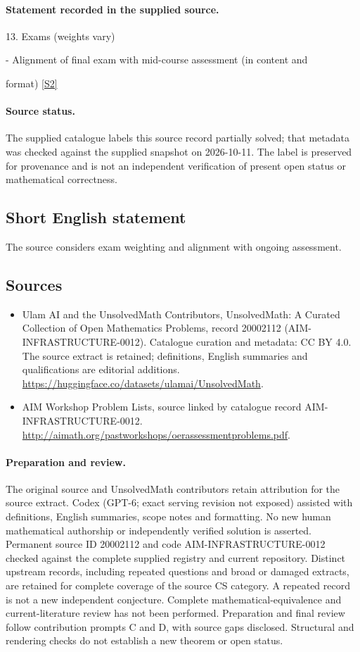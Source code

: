 \documentclass[11pt]{article}
\begin{document}
\paragraph{Statement recorded in the supplied source.}
13. Exams (weights vary)

- Alignment of final exam with mid-course assessment (in content and

format) \href{http://aimath.org/pastworkshops/oerassessmentproblems.pdf}{[S2]}
\paragraph{Source status.}
The supplied catalogue labels this source record partially solved; that metadata was checked against the supplied snapshot on 2026-10-11. The label is preserved for provenance and is not an independent verification of present open status or mathematical correctness.
\subsection{Short English statement}
The source considers exam weighting and alignment with ongoing assessment.
\subsection{Sources}
\begin{itemize}
\item[S1] Ulam AI and the UnsolvedMath Contributors, UnsolvedMath: A Curated Collection of Open Mathematics Problems, record 20002112 (AIM-INFRASTRUCTURE-0012). Catalogue curation and metadata: CC BY 4.0. The source extract is retained; definitions, English summaries and qualifications are editorial additions.
\url{https://huggingface.co/datasets/ulamai/UnsolvedMath}.
\item[S2] AIM Workshop Problem Lists, source linked by catalogue record AIM-INFRASTRUCTURE-0012.
\url{http://aimath.org/pastworkshops/oerassessmentproblems.pdf}.
\end{itemize}
\paragraph{Preparation and review.}
The original source and UnsolvedMath contributors retain attribution for the source extract. Codex (GPT-6; exact serving revision not exposed) assisted with definitions, English summaries, scope notes and formatting. No new human mathematical authorship or independently verified solution is asserted. Permanent source ID 20002112 and code AIM-INFRASTRUCTURE-0012 checked against the complete supplied registry and current repository. Distinct upstream records, including repeated questions and broad or damaged extracts, are retained for complete coverage of the source CS category. A repeated record is not a new independent conjecture. Complete mathematical-equivalence and current-literature review has not been performed. Preparation and final review follow contribution prompts C and D, with source gaps disclosed. Structural and rendering checks do not establish a new theorem or open status.
\label{end:20002112}
\end{document}
